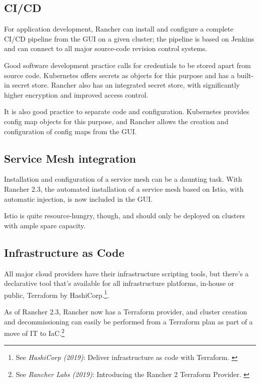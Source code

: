\subsection{CI/CD}

For application development, Rancher can install and configure a complete CI/CD pipeline from the GUI on a given cluster; the pipeline is based on Jenkins and can connect to all major source-code revision control systems.

Good software development practice calls for credentials to be stored apart from source code. Kubernetes offers secrets as objects for this purpose and has a built-in secret store. Rancher also has an integrated secret store, with significantly higher encryption and improved access control.

It is also good practice to separate code and configuration. Kubernetes provides config map objects for this purpose, and Rancher allows the creation and configuration of config maps from the GUI.

\subsection{Service Mesh integration}

Installation and configuration of a service mesh can be a daunting task. With Rancher 2.3, the automated installation of a service mesh based on Istio, with automatic injection, is now included in the GUI.

Istio is quite resource-hungry, though, and should only be deployed on clusters with ample spare capacity.

\subsection{Infrastructure as Code}

All major cloud providers have their infrastructure scripting tools, but there's a declarative tool that's available for all infrastructure platforms, in-house or public, Terraform by HashiCorp.\footnote{See \textit{HashiCorp (2019)}: Deliver infrastructure as code with Terraform. \cite{terraform}}.

As of Rancher 2.3, Rancher now has a Terraform provider, and cluster creation and decommissioning can easily be performed from a Terraform plan as part of a move of IT to IaC.\footnote{See \textit{Rancher Labs (2019)}: Introducing the Rancher 2 Terraform Provider. \cite{terraformProvider}}
